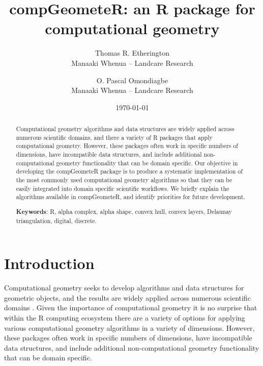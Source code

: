 \documentclass[12pt, a4paper]{article}
\begin{document}
\title{compGeometeR: an R package for computational geometry}

\author{Thomas R. Etherington  \\
	Manaaki Whenua -- Landcare Research  \\
	\and 
	O. Pascal Omondiagbe \\
	Manaaki Whenua -- Landcare Research \\
	}



\date{\today}



\maketitle


\begin{abstract}

Computational geometry algorithms and data structures are widely applied across numerous scientific domains, and there a variety of R packages that apply computational geometry.  However, these packages often work in specific numbers of dimensions, have incompatible data structures, and include additional non-computational geometry functionality that can be domain specific.  Our objective in developing the compGeometeR package is to produce a systematic implementation of the most commonly used computational geometry algorithms so that they can be easily integrated into domain specific scientific workflows.  We briefly explain the algorithms available in compGeometeR, and identify priorities for future development.

\begin{center}
\textbf{Keywords}: R, alpha complex, alpha shape, convex hull, convex layers, Delaunay triangulation, digital, discrete.
\end{center}

\end{abstract}

\section{Introduction}

Computational geometry seeks to develop algorithms and data structures for geometric objects, and the results are widely applied across numerous scientific domains \citep{de-berg-2008}.  Given the importance of computational geometry it is no surprise that within the R computing ecosystem there are a variety of options for applying various computational geometry algorithms in a variety of dimensions.  However, these packages often work in specific numbers of dimensions, have incompatible data structures, and include additional non-computational geometry functionality that can be domain specific.
\end{document}
